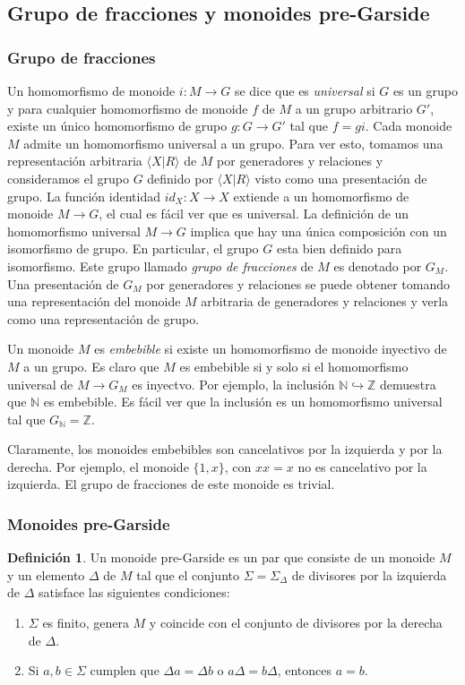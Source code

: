 \documentclass[12pt]{article}
\theoremstyle{definition}
\newtheorem{defi}{Definición}[section]
\begin{document}
\subsection{Grupo de fracciones y monoides pre-Garside}
\subsubsection{Grupo de fracciones}

Un homomorfismo de monoide $i:M\rightarrow G$ se dice que es \textit{universal} si $G$ es un grupo y para cualquier homomorfismo de monoide $f$ de $M$ a un grupo arbitrario $G'$, existe un único homomorfismo de grupo $g:G\rightarrow G'$ tal que $f=gi$. Cada monoide $M$ admite un homomorfismo universal a un grupo. Para ver esto, tomamos una representación arbitraria $\langle X | R \rangle$ de $M$ por generadores y relaciones y consideramos el grupo $G$ definido por $\langle X | R \rangle$ visto como una presentación de grupo. La función identidad $id_X:X\rightarrow X$ extiende a un homomorfismo de monoide $M\rightarrow G$, el cual es fácil ver que es universal. La definición de un homomorfismo universal $M\rightarrow G$ implica que hay una única composición con un isomorfismo de grupo. En particular, el grupo $G$ esta bien definido para isomorfismo. Este grupo llamado \textit{grupo de fracciones} de $M$ es denotado por $G_M$. Una presentación de $G_M$ por generadores y relaciones se puede obtener tomando una representación del monoide $M$ arbitraria de generadores y relaciones y verla como una representación de grupo.

Un monoide $M$ es \textit{embebible} si existe un homomorfismo de monoide inyectivo de $M$ a un grupo. Es claro que $M$ es embebible si y solo si el homomorfismo universal de $M\rightarrow G_M$ es inyectvo. Por ejemplo, la inclusión $\mathbb{N}\hookrightarrow\mathbb{Z}$ demuestra que $\mathbb{N}$ es embebible. Es fácil ver que la inclusión es un homomorfismo universal tal que $G_\mathbb{N}=\mathbb{Z}$.

Claramente, los monoides embebibles son cancelativos por la izquierda y por la derecha. Por ejemplo, el monoide $\{1,x\}$, con $xx=x$ no es cancelativo por la izquierda. El grupo de fracciones de este monoide es trivial.

\subsubsection{Monoides pre-Garside}

\begin{defi}
Un monoide pre-Garside es un par que consiste de un monoide $M$ y un elemento $\Delta$ de $M$ tal que el conjunto $\Sigma=\Sigma_\Delta$ de divisores por la izquierda de $\Delta$ satisface las siguientes condiciones:

\begin{enumerate}
\item $\Sigma$ es finito, genera $M$ y  coincide con el conjunto de divisores por la derecha de $\Delta$.
\item Si $a,b\in\Sigma$ cumplen que $\Delta a=\Delta b$ o $a\Delta=b\Delta$, entonces $a=b$.
\end{enumerate}
\label{defi:pre-garside}
\end{defi}
\end{document}
